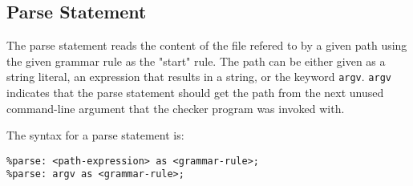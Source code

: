 
\subsection{Parse Statement}
{
	The parse statement reads the content of the file refered to by a given path
	using the given grammar rule as the "start" rule.
	The path can be either given as a
	string literal, an expression that results in a string, or the
	keyword \texttt{argv}.
	\texttt{argv} indicates that the parse statement should get the path from
	the next unused command-line argument that the checker program was invoked
	with.
	
	The syntax for a parse statement is:
	\begin{lstlisting}[numbers = none, texcl = true, language = MAIA]
%parse: "path/to/file" as <grammar-rule>;
%parse: <path-expression> as <grammar-rule>;
%parse: argv as <grammar-rule>;
	\end{lstlisting}
}
